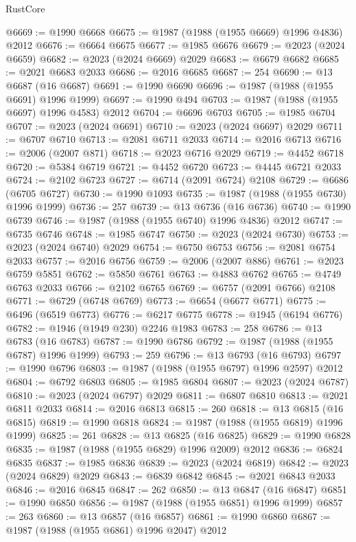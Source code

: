 \begin{lexlean}{RustCore}
\begin{coremodule}
@6669 := @1990 @6668
@6675 := @1987 (@1988 (@1955 @6669) @1996 @4836) @2012
@6676 := @6664 @6675
@6677 := @1985 @6676
@6679 := @2023 (@2024 @6659)
@6682 := @2023 (@2024 @6669) @2029
@6683 := @6679 @6682
@6685 := @2021 @6683 @2033
@6686 := @2016 @6685
@6687 := 254
@6690 := @13 @6687 (@16 @6687)
@6691 := @1990 @6690
@6696 := @1987 (@1988 (@1955 @6691) @1996 @1999)
@6697 := @1990 @494
@6703 := @1987 (@1988 (@1955 @6697) @1996 @4583) @2012
@6704 := @6696 @6703
@6705 := @1985 @6704
@6707 := @2023 (@2024 @6691)
@6710 := @2023 (@2024 @6697) @2029
@6711 := @6707 @6710
@6713 := @2081 @6711 @2033
@6714 := @2016 @6713
@6716 := @2006 (@2007 @871)
@6718 := @2023 @6716 @2029
@6719 := @4452 @6718
@6720 := @5384 @6719
@6721 := @4452 @6720
@6723 := @4445 @6721 @2033
@6724 := @2102 @6723
@6727 := @6714 (@2091 @6724) @2108
@6729 := @6686 (@6705 @6727)
@6730 := @1990 @1093
@6735 := @1987 (@1988 (@1955 @6730) @1996 @1999)
@6736 := 257
@6739 := @13 @6736 (@16 @6736)
@6740 := @1990 @6739
@6746 := @1987 (@1988 (@1955 @6740) @1996 @4836) @2012
@6747 := @6735 @6746
@6748 := @1985 @6747
@6750 := @2023 (@2024 @6730)
@6753 := @2023 (@2024 @6740) @2029
@6754 := @6750 @6753
@6756 := @2081 @6754 @2033
@6757 := @2016 @6756
@6759 := @2006 (@2007 @886)
@6761 := @2023 @6759 @5851
@6762 := @5850 @6761
@6763 := @4883 @6762
@6765 := @4749 @6763 @2033
@6766 := @2102 @6765
@6769 := @6757 (@2091 @6766) @2108
@6771 := @6729 (@6748 @6769)
@6773 := @6654 (@6677 @6771)
@6775 := @6496 (@6519 @6773)
@6776 := @6217 @6775
@6778 := @1945 (@6194 @6776)
@6782 := @1946 (@1949 @230) @2246 @1983
@6783 := 258
@6786 := @13 @6783 (@16 @6783)
@6787 := @1990 @6786
@6792 := @1987 (@1988 (@1955 @6787) @1996 @1999)
@6793 := 259
@6796 := @13 @6793 (@16 @6793)
@6797 := @1990 @6796
@6803 := @1987 (@1988 (@1955 @6797) @1996 @2597) @2012
@6804 := @6792 @6803
@6805 := @1985 @6804
@6807 := @2023 (@2024 @6787)
@6810 := @2023 (@2024 @6797) @2029
@6811 := @6807 @6810
@6813 := @2021 @6811 @2033
@6814 := @2016 @6813
@6815 := 260
@6818 := @13 @6815 (@16 @6815)
@6819 := @1990 @6818
@6824 := @1987 (@1988 (@1955 @6819) @1996 @1999)
@6825 := 261
@6828 := @13 @6825 (@16 @6825)
@6829 := @1990 @6828
@6835 := @1987 (@1988 (@1955 @6829) @1996 @2009) @2012
@6836 := @6824 @6835
@6837 := @1985 @6836
@6839 := @2023 (@2024 @6819)
@6842 := @2023 (@2024 @6829) @2029
@6843 := @6839 @6842
@6845 := @2021 @6843 @2033
@6846 := @2016 @6845
@6847 := 262
@6850 := @13 @6847 (@16 @6847)
@6851 := @1990 @6850
@6856 := @1987 (@1988 (@1955 @6851) @1996 @1999)
@6857 := 263
@6860 := @13 @6857 (@16 @6857)
@6861 := @1990 @6860
@6867 := @1987 (@1988 (@1955 @6861) @1996 @2047) @2012

\end{coremodule}
\end{lexlean}
